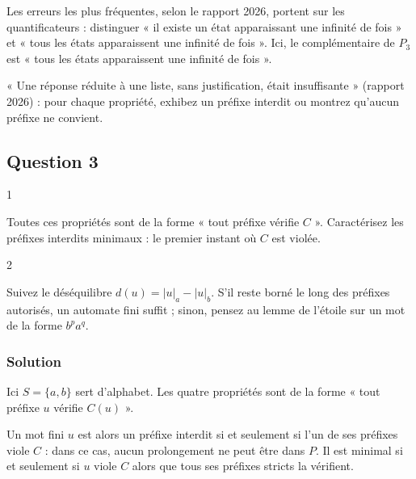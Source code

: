 \documentclass[11pt,a4paper]{article}
\begin{document}
\begin{piege}

Les erreurs les plus fréquentes, selon le rapport 2026, portent sur les quantificateurs : distinguer « il existe un état apparaissant une infinité de fois » et « tous les états apparaissent une infinité de fois ». Ici, le complémentaire de \(P_3\) est « tous les états apparaissent une infinité de fois ».

\end{piege}

\begin{jury}

« Une réponse réduite à une liste, sans justification, était insuffisante » (rapport 2026) : pour chaque propriété, exhibez un préfixe interdit ou montrez qu'aucun préfixe ne convient.

\end{jury}

\hypertarget{question-3}{%
\subsection{Question 3}\label{question-3}}

\begin{indication}{1}

Toutes ces propriétés sont de la forme « tout préfixe vérifie \(C\) ». Caractérisez les préfixes interdits minimaux : le premier instant où \(C\) est violée.

\end{indication}

\begin{indication}{2}

Suivez le déséquilibre \(d(u)=|u|_a-|u|_b\). S'il reste borné le long des préfixes autorisés, un automate fini suffit ; sinon, pensez au lemme de l'étoile sur un mot de la forme \(b^pa^{q}\).

\end{indication}

\hypertarget{solution-2}{%
\subsubsection{Solution}\label{solution-2}}

Ici \(S=\{a,b\}\) sert d'alphabet. Les quatre propriétés sont de la forme « tout préfixe \(u\) vérifie \(C(u)\) ».

Un mot fini \(u\) est alors un préfixe interdit si et seulement si l'un de ses préfixes viole \(C\) : dans ce cas, aucun prolongement ne peut être dans \(P\). Il est minimal si et seulement si \(u\) viole \(C\) alors que tous ses préfixes stricts la vérifient.
\end{document}
